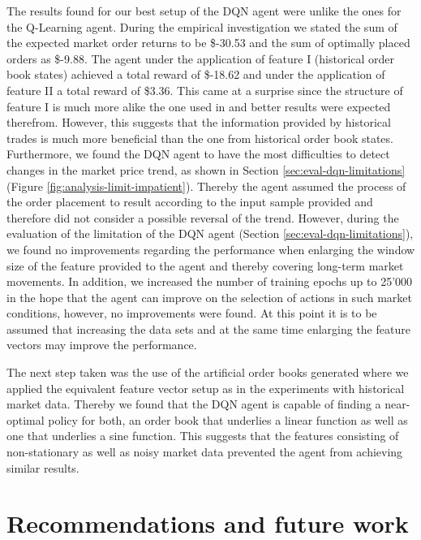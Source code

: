     The results found for our best setup of the DQN agent were unlike the ones for the Q-Learning agent.
    During the empirical investigation we stated the sum of the expected market order returns to be \$-30.53 and the sum of optimally placed orders as \$-9.88.
    The agent under the application of feature I (historical order book states) achieved a total reward of \$-18.62 and under the application of feature II a total reward of \$3.36.
    This came at a surprise since the structure of feature I is much more alike the one used in \cite{mnih2013playing} and better results were expected therefrom.
    However, this suggests that the information provided by historical trades is much more beneficial than the one from historical order book states.
    Furthermore, we found the DQN agent to have the most difficulties to detect changes in the market price trend, as shown in Section \ref{sec:eval-dqn-limitations} (Figure \ref{fig:analysis-limit-impatient}).
    Thereby the agent assumed the process of the order placement to result according to the input sample provided and therefore did not consider a possible reversal of the trend.
    However, during the evaluation of the limitation of the DQN agent (Section \ref{sec:eval-dqn-limitations}), we found no improvements regarding the performance when enlarging the window size of the feature provided to the agent and thereby covering long-term market movements.
    In addition, we increased the number of training epochs up to 25'000 in the hope that the agent can improve on the selection of actions in such market conditions, however, no improvements were found.
    At this point it is to be assumed that increasing the data sets and at the same time enlarging the feature vectors may improve the performance.
    
    The next step taken was the use of the artificial order books generated where we applied the equivalent feature vector setup as in the experiments with historical market data.
    Thereby we found that the DQN agent is capable of finding a near-optimal policy for both, an order book that underlies a linear function as well as one that underlies a sine function.
    This suggests that the features consisting of non-stationary as well as noisy market data prevented the agent from achieving similar results.

\section{Recommendations and future work}

